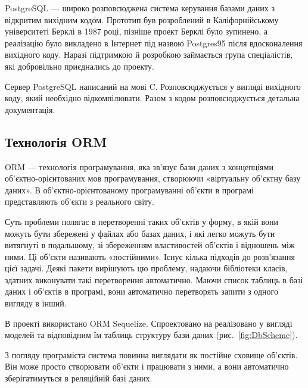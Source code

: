 PostgreSQL — широко розповсюджена система керування базами даних з відкритим вихідним кодом. Прототип був розроблений в Каліфорнійському університеті Берклі в 1987 році, пізніше проект Берклі було зупинено, а реалізацію було викладено в Інтернет під назвою Postgres95 після вдосконалення вихідного коду. Наразі підтримкою й розробкою займається група спеціалістів, які добровільно приєднались до проекту.

Сервер PostgreSQL написаний на мові C. Розповсюджується у вигляді вихідного коду, який необхідно відкомпілювати. Разом з кодом розповсюджується детальна документація.

\subsection{Технологія ORM}

ORM — технологія програмування, яка зв'язує бази даних з концепціями об'єктно-орієнтованих мов програмування, створюючи «віртуальну об'єктну базу даних». В об'єктно-орієнтованому програмуванні об'єкти в програмі представляють об'єкти з реального світу. 

Суть проблеми полягає в перетворенні таких об'єктів у форму, в якій вони можуть бути збережені у файлах або базах даних, і які легко можуть бути витягнуті в подальшому, зі збереженням властивостей об'єктів і відношень між ними. Ці об'єкти називають «постійними». Існує кілька підходів до розв'язання цієї задачі. Деякі пакети вирішують цю проблему, надаючи бібліотеки класів, здатних виконувати такі перетворення автоматично. Маючи список таблиць в базі даних і об'єктів в програмі, вони автоматично перетворять запити з одного вигляду в інший.

В проекті використано ORM Sequelize. Спроектовано на реалізовано у вигляді моделей та відповідним їм таблиць структуру бази даних (рис.~\ref{fig:DbScheme}).


З погляду програміста система повинна виглядати як постійне сховище об'єктів. Він може просто створювати об'єкти і працювати з ними, а вони автоматично зберігатимуться в реляційній базі даних.
